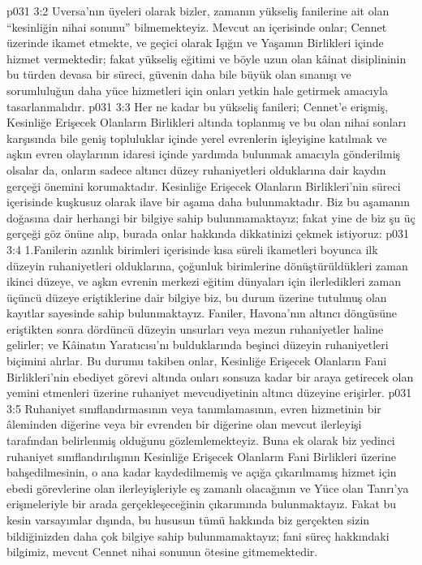 \vs p031 3:2 Uversa’nın üyeleri olarak bizler, zamanın yükseliş fanilerine ait olan “kesinliğin nihai sonunu” bilmemekteyiz. Mevcut an içerisinde onlar; Cennet üzerinde ikamet etmekte, ve geçici olarak Işığın ve Yaşamın Birlikleri içinde hizmet vermektedir; fakat yükseliş eğitimi ve böyle uzun olan kâinat disiplininin bu türden devasa bir süreci, güvenin daha bile büyük olan sınanışı ve sorumluluğun daha yüce hizmetleri için onları yetkin hale getirmek amacıyla tasarlanmalıdır.
\vs p031 3:3 Her ne kadar bu yükseliş fanileri; Cennet’e erişmiş, Kesinliğe Erişecek Olanların Birlikleri altında toplanmış ve bu  olan nihai sonları karşısında bile geniş topluluklar içinde yerel evrenlerin işleyişine katılmak ve aşkın evren olaylarının idaresi içinde yardımda bulunmak amacıyla gönderilmiş olsalar da, onların sadece altıncı düzey ruhaniyetleri olduklarına dair kaydın gerçeği önemini korumaktadır. Kesinliğe Erişecek Olanların Birlikleri’nin süreci içerisinde kuşkusuz olarak ilave bir aşama daha bulunmaktadır. Biz bu aşamanın doğasına dair herhangi bir bilgiye sahip bulunmamaktayız; fakat yine de biz şu üç gerçeği göz önüne alıp, burada onlar hakkında dikkatinizi çekmek istiyoruz:
\vs p031 3:4 1.\bibnobreakspace Fanilerin azınlık birimleri içerisinde kısa süreli ikametleri boyunca ilk düzeyin ruhaniyetleri olduklarına, çoğunluk birimlerine dönüştürüldükleri zaman ikinci düzeye, ve aşkın evrenin merkezi eğitim dünyaları için ilerledikleri zaman üçüncü düzeye eriştiklerine dair bilgiye biz, bu durum üzerine tutulmuş olan kayıtlar sayesinde sahip bulunmaktayız. Faniler, Havona’nın altıncı döngüsüne eriştikten sonra dördüncü düzeyin unsurları veya mezun ruhaniyetler haline gelirler; ve Kâinatın Yaratıcısı’nı bulduklarında beşinci düzeyin ruhaniyetleri biçimini alırlar. Bu durumu takiben onlar, Kesinliğe Erişecek Olanların Fani Birlikleri’nin ebediyet görevi altında onları sonsuza kadar bir araya getirecek olan yemini etmenleri üzerine ruhaniyet mevcudiyetinin altıncı düzeyine erişirler.
\vs p031 3:5 Ruhaniyet sınıflandırmasının veya tanımlamasının, evren hizmetinin bir âleminden diğerine veya bir evrenden bir diğerine olan mevcut ilerleyişi tarafından belirlenmiş olduğunu gözlemlemekteyiz. Buna ek olarak biz yedinci ruhaniyet sınıflandırılışının Kesinliğe Erişecek Olanların Fani Birlikleri üzerine bahşedilmesinin, o ana kadar kaydedilmemiş ve açığa çıkarılmamış hizmet için ebedi görevlerine olan ilerleyişleriyle eş zamanlı olacağının ve Yüce olan Tanrı’ya erişmeleriyle bir arada gerçekleşeceğinin çıkarımında bulunmaktayız. Fakat bu kesin varsayımlar dışında, bu hususun tümü hakkında biz gerçekten sizin bildiğinizden daha çok bilgiye sahip bulunmamaktayız; fani süreç hakkındaki bilgimiz, mevcut Cennet nihai sonunun ötesine gitmemektedir.

